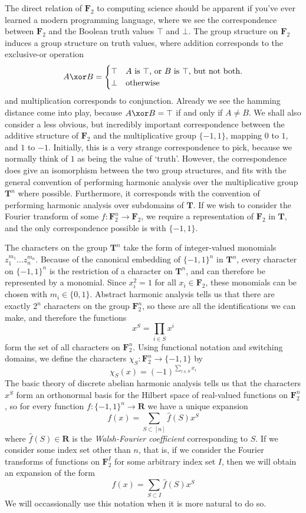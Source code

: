 The direct relation of $\mathbf{F}_2$ to computing science should be apparent if you've ever learned a modern programming language, where we see the correspondence between $\mathbf{F}_2$ and the Boolean truth values $\top$ and $\bot$. The group structure on $\mathbf{F}_2$ induces a group structure on truth values, where addition corresponds to the exclusive-or operation
%
\[ A \xor B = \begin{cases} \top & A\ \text{is}\ \top\text{, or}\ B\ \text{is}\ \top\text{, but not both.}\\ \bot & \text{otherwise} \end{cases} \]
%
and multiplication corresponds to conjunction. Already we see the hamming distance come into play, because $A \xor B = \top$ if and only if $A \neq B$. We shall also consider a less obvious, but incredibly important correspondence between the additive structure of $\mathbf{F}_2$ and the multiplicative group $\{ -1, 1 \}$, mapping $0$ to $1$, and $1$ to $-1$. Initially, this is a very strange correspondence to pick, because we normally think of $1$ as being the value of `truth'. However, the correspondence does give an isomorphism between the two group structures, and fits with the general convention of performing harmonic analysis over the multiplicative group $\mathbf{T}^n$ where possible. Furthermore, it corresponds with the convention of performing harmonic analysis over subdomains of $\mathbf{T}$. If we wish to consider the Fourier transform of some $f: \mathbf{F}_2^n \to \mathbf{F}_2$, we require a representation of $\mathbf{F}_2$ in $\mathbf{T}$, and the only correspondence possible is with $\{ -1, 1 \}$.

The characters on the group $\mathbf{T}^n$ take the form of integer-valued monomials $z_1^{m_1} \dots z_n^{m_n}$. Because of the canonical embedding of $\{ -1, 1 \}^n$ in $\mathbf{T}^n$, every character on $\{ -1, 1 \}^n$ is the restriction of a character on $\mathbf{T}^n$, and can therefore be represented by a monomial. Since $x_i^2 = 1$ for all $x_i \in \mathbf{F}_2$, these monomials can be chosen with $m_i \in \{ 0, 1 \}$. Abstract harmonic analysis tells us that there are exactly $2^n$ characters on the group $\mathbf{F}_2^n$, so these are all the identifications we can make, and therefore the functions
%
\[ x^S = \prod_{i \in S} x^i \]
%
form the set of all characters on $\mathbf{F}_2^n$. Using functional notation and switching domains, we define the characters $\chi_S: \mathbf{F}_2^n \to \{ -1, 1 \}$ by
%
\[ \chi_S(x) = (-1)^{\sum_{i \in S} x_i} \]
%
The basic theory of discrete abelian harmonic analysis tells us that the characters $x^S$ form an orthonormal basis for the Hilbert space of real-valued functions on $\mathbf{F}_2^n$, so for every function $f: \{ -1, 1 \}^n \to \mathbf{R}$ we have a unique expansion
%
\[ f(x) = \sum_{S \subset [n]} \widehat{f}(S) x^S \]
%
where $\widehat{f}(S) \in \mathbf{R}$ is the {\it Walsh-Fourier coefficient} corresponding to $S$. If we consider some index set other than $n$, that is, if we consider the Fourier transforms of functions on $\mathbf{F}_2^I$ for some arbitrary index set $I$, then we will obtain an expansion of the form
%
\[ f(x) = \sum_{S \subset I} \widehat{f}(S) x^S \]
%
We will occassionally use this notation when it is more natural to do so.


